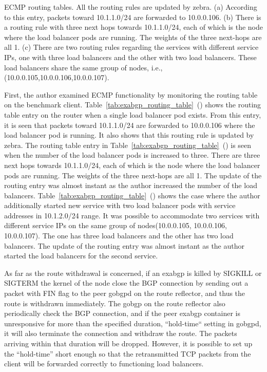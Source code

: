 {\begin{table}[h]
  \par\bigskip
  \centering
  \begin{minipage}{0.9\columnwidth}
    \caption[ECMP routing tables]{
ECMP routing tables. All the routing rules are updated by zebra.
(a) According to this entry, packets toward 10.1.1.0/24 are forwarded to 10.0.0.106.
(b) There is a routing rule with three next hops towards 10.1.1.0/24, each of which is the node where the load balancer pods are running.
The weights of the three next-hops are all 1.
(c) There are two routing rules regarding the services with different service IPs, one with three load balancers and the other with two load balancers.
These load balancers share the same group of nodes, i.e., (10.0.0.105,10.0.0.106,10.0.0.107).
    }
    \label{tab:exabgp_routing_table}
  \end{minipage}
\end{table}
}

First, the author examined ECMP functionality by monitoring the routing table on the benchmark client.
Table~\ref{tab:exabgp_routing_table}~() shows the routing table entry on the router when a single load balancer pod exists.
From this entry, it is seen that packets toward 10.1.1.0/24 are forwarded to 10.0.0.106 where the load balancer pod is running.
It also shows that this routing rule is updated by zebra.
%
The routing table entry in Table~\ref{tab:exabgp_routing_table}~() is seen when the number of the load balancer pods is increased to three.
There are three next hops towards 10.1.1.0/24, each of which is the node where the load balancer pods are running.
The weights of the three next-hops are all 1.
The update of the routing entry was almost instant as the author increased the number of the load balancers.
%
Table~\ref{tab:exabgp_routing_table}~() shows the case where the author additionally started new service with two load balancer pods with service addresses in 10.1.2.0/24 range.
It was possible to accommodate two services with different service IPs on the same group of nodes(10.0.0.105, 10.0.0.106, 10.0.0.107). 
The one has three load balancers and the other has two load balancers.
The update of the routing entry was almost instant as the author started the load balancers for the second service.

As far as the route withdrawal is concerned, if an exabgp is killed by SIGKILL or SIGTERM the kernel of the node close the BGP connection by sending out a packet with FIN flag to the peer gobgpd on the route reflector, and thus the route is withdrawn immediately.
The gobgp on the route reflector also periodically check the BGP connection, and if the peer exabgp container is unresponsive for more than the specified duration, “hold-time“ setting in gobgpd, it will also terminate the connection and withdraw the route.
The packets arriving within that duration will be dropped.
However, it is possible to set up the “hold-time” short enough so that the retransmitted TCP packets from the client will be forwarded correctly to functioning load balancers.

